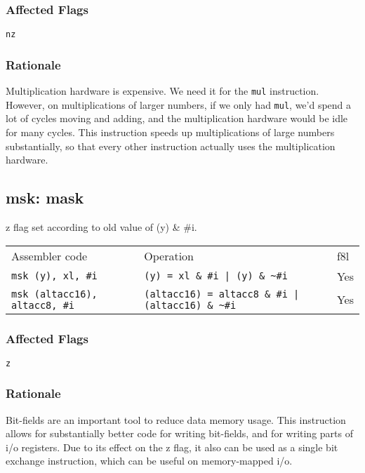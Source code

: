 \documentclass{book}
\begin{document}
\subsubsection*{Affected Flags}

\texttt{nz}

\subsubsection*{Rationale}

Multiplication hardware is expensive. We need it for the \texttt{mul} instruction. However, on multiplications of larger numbers, if we only had \texttt{mul}, we'd spend a lot of cycles moving and adding, and the multiplication hardware would be idle for many cycles. This instruction speeds up multiplications of large numbers substantially, so that every other instruction actually uses the multiplication hardware.


\subsection{msk: mask}

z flag set according to old value of  (y) \& \#i.

\begin{tabular}{l l l}
Assembler code                        & Operation                                                    & f8l \\
\texttt{msk (y), xl, \#i}             & \texttt{(y) = xl \& \#i | (y) \& \~{}\#i}                    & Yes \\
\texttt{msk (altacc16), altacc8, \#i} & \texttt{(altacc16) = altacc8 \& \#i | (altacc16) \& \~{}\#i} & Yes \\
\end{tabular}

\subsubsection*{Affected Flags}

\texttt{z}

\subsubsection*{Rationale}

Bit-fields are an important tool to reduce data memory usage. This instruction allows for substantially better code for writing bit-fields, and for writing parts of i/o registers. Due to its effect on the z flag, it also can be used as a single bit exchange instruction, which can be useful on memory-mapped i/o.
\end{document}
